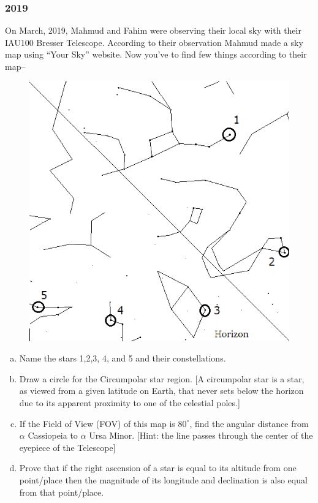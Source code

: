 \documentclass[a4paper,12pt]{extarticle}
\begin{document}
\subsubsection{2019}
On  March, 2019, Mahmud and Fahim were observing their local sky with their IAU100 Bresser Telescope. According to their observation Mahmud made a sky map using “Your Sky” website. Now you’ve to find few things according to their map--

\begin{figure}[H]
    \centering
    \includegraphics[width=0.8\linewidth]{BDOAA_19.png}
\end{figure}
\begin{enumerate}[a.]
    \item Name the stars 1,2,3, 4, and 5 and their constellations.
    \item Draw a circle for the Circumpolar star region. [A circumpolar star is a star, as viewed from a given latitude on Earth, that never sets below the horizon due to its apparent proximity to one of the celestial poles.]
    \item If the Field of View (FOV) of this map is $80^\circ$, find the angular distance from $\alpha$ Cassiopeia to $\alpha$ Ursa Minor. [Hint: the line passes through the center of the eyepiece of the Telescope]
    \item Prove that if the right ascension of a star is equal to its altitude from one point/place then the magnitude of its longitude and declination is also equal from that point/place.
\end{enumerate}
\end{document}
